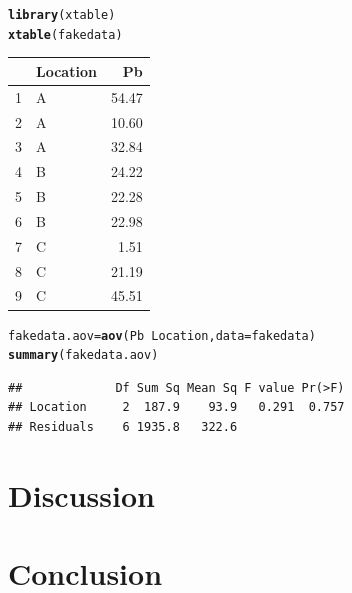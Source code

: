 \documentclass{article}\usepackage[]{graphicx}\usepackage[]{color}
\makeatletter
\newcommand{\hlopt}[1]{\textcolor[rgb]{0,0,0}{#1}}%
\newcommand{\hlstd}[1]{\textcolor[rgb]{0.345,0.345,0.345}{#1}}%
\newcommand{\hlkwb}[1]{\textcolor[rgb]{0.69,0.353,0.396}{#1}}%
\newcommand{\hlkwc}[1]{\textcolor[rgb]{0.333,0.667,0.333}{#1}}%
\newcommand{\hlkwd}[1]{\textcolor[rgb]{0.737,0.353,0.396}{\textbf{#1}}}%
\newenvironment{kframe}{%
 \def\at@end@of@kframe{}%
 \ifinner\ifhmode%
  \def\at@end@of@kframe{\end{minipage}}%
  \begin{minipage}{\columnwidth}%
 \fi\fi%
 \def\FrameCommand##1{\hskip\@totalleftmargin \hskip-\fboxsep
 \colorbox{shadecolor}{##1}\hskip-\fboxsep
     \hskip-\linewidth \hskip-\@totalleftmargin \hskip\columnwidth}%
 \MakeFramed {\advance\hsize-\width
   \@totalleftmargin\z@ \linewidth\hsize
   \@setminipage}}%
 {\par\unskip\endMakeFramed%
 \at@end@of@kframe}
\newenvironment{knitrout}{}{} %
\makeatother
\begin{document}
\begin{kframe}
\begin{alltt}
\hlkwd{library}\hlstd{(xtable)}
\hlkwd{xtable}\hlstd{(fakedata)}
\end{alltt}
\end{kframe}%
\begin{table}[ht]
\centering
\begin{tabular}{rlr}
  \hline
 & Location & Pb \\ 
  \hline
1 & A & 54.47 \\ 
  2 & A & 10.60 \\ 
  3 & A & 32.84 \\ 
  4 & B & 24.22 \\ 
  5 & B & 22.28 \\ 
  6 & B & 22.98 \\ 
  7 & C & 1.51 \\ 
  8 & C & 21.19 \\ 
  9 & C & 45.51 \\ 
   \hline
\end{tabular}
\end{table}


\begin{knitrout}
\color{fgcolor}\begin{kframe}
\begin{alltt}
\hlstd{fakedata.aov} \hlkwb{=} \hlkwd{aov}\hlstd{(Pb} \hlopt{~} \hlstd{Location,} \hlkwc{data}\hlstd{=fakedata)}
\hlkwd{summary}\hlstd{(fakedata.aov)}
\end{alltt}
\begin{verbatim}
##             Df Sum Sq Mean Sq F value Pr(>F)
## Location     2  187.9    93.9   0.291  0.757
## Residuals    6 1935.8   322.6
\end{verbatim}
\end{kframe}
\end{knitrout}
\section{Discussion}

\section{Conclusion}


\end{document}
